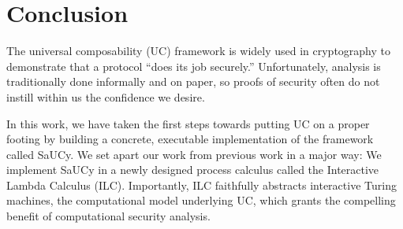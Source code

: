 \section{Conclusion}
\label{sec:conclusion}

The universal composability (UC) framework is widely used in cryptography to
demonstrate that a protocol ``does its job securely.'' Unfortunately, analysis
is traditionally done informally and on paper, so proofs of security often do
not instill within us the confidence we desire.

In this work, we have taken the first steps towards putting UC on a proper
footing by building a concrete, executable implementation of the framework
called SaUCy. We set apart our work from previous work in a major way: We
implement SaUCy in a newly designed process calculus called the Interactive
Lambda Calculus (ILC). Importantly, ILC faithfully abstracts interactive Turing
machines, the computational model underlying UC, which grants the compelling
benefit of computational security analysis. 
